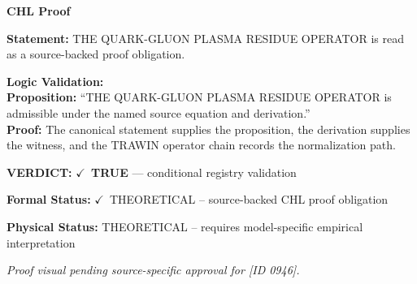 \vspace{0.45em}
\noindent\textbf{CHL Proof}\par
\textbf{Statement:} THE QUARK-GLUON PLASMA RESIDUE OPERATOR is read as a source-backed proof obligation.

\textbf{Logic Validation:}\\
\textbf{Proposition:} ``THE QUARK-GLUON PLASMA RESIDUE OPERATOR is admissible under the named source equation and derivation.''\\
\textbf{Proof:} The canonical statement supplies the proposition, the derivation supplies the witness, and the TRAWIN operator chain records the normalization path.

\textbf{VERDICT:} \ensuremath{\checkmark}\ \textbf{TRUE} --- conditional registry validation

\textbf{Formal Status:} \ensuremath{\checkmark}\ THEORETICAL -- source-backed CHL proof obligation

\textbf{Physical Status:} THEORETICAL -- requires model-specific empirical interpretation
\par\vspace{0.45em}
\par
\vfill
\begingroup\footnotesize\itshape
Proof visual pending source-specific approval for [ID 0946].
\par\endgroup
\vfill
\endgroup
\endgroup
